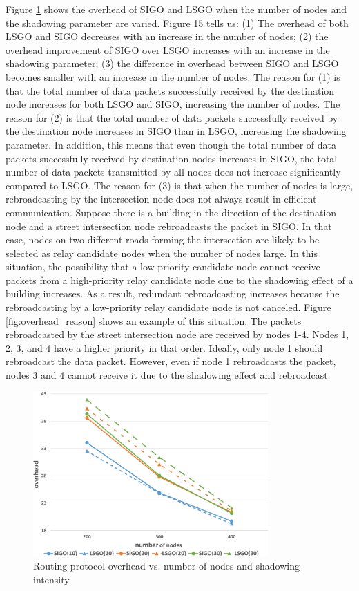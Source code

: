 \documentclass[conference]{IEEEtran}
\begin{document}


Figure \ref{fig:overhead} shows the overhead of SIGO and LSGO when the number of nodes and the shadowing parameter are varied. Figure 15 tells us: (1) The overhead of both LSGO and SIGO decreases with an increase in the number of nodes; (2) the overhead improvement of SIGO over LSGO increases with an increase in the shadowing parameter; (3) the difference in overhead between SIGO and LSGO becomes smaller with an increase in the number of nodes. The reason for (1) is that the total number of data packets successfully received by the destination node increases for both LSGO and SIGO, increasing the number of nodes. The reason for (2) is that the total number of data packets successfully received by the destination node increases in SIGO than in LSGO, increasing the shadowing parameter. In addition, this means that even though the total number of data packets successfully received by destination nodes increases in SIGO, the total number of data packets transmitted by all nodes does not increase signiﬁcantly compared to LSGO. The reason for (3) is that when the number of nodes is large, rebroadcasting by the intersection node does not always result in efficient communication. Suppose there is a building in the direction of the destination node and a street intersection node rebroadcasts the packet in SIGO. In that case, nodes on two different roads forming the intersection are likely to be selected as relay candidate nodes when the number of nodes large. In this situation, the possibility that a low priority candidate node cannot receive packets from a high-priority relay candidate node due to the shadowing effect of a building increases. As a result, redundant rebroadcasting increases because the rebroadcasting by a low-priority relay candidate node is not canceled. Figure \ref{fig:overhead_reason} shows an example of this situation. The packets rebroadcasted by the street intersection node are received by nodes 1-4. Nodes 1, 2, 3, and 4 have a higher priority in that order. Ideally, only node 1 should rebroadcast the data packet. However, even if node 1 rebroadcasts the packet, nodes 3 and 4 cannot receive it due to the shadowing effect and rebroadcast.






\begin{figure}[!ht]
\centering
\includegraphics[width=90mm]{figures/overhead.eps}
\caption{Routing protocol overhead vs. number of nodes and shadowing intensity }
\label{fig:overhead}
\end{figure}
\end{document}
